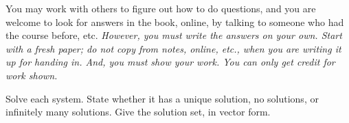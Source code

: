 \documentclass[answers]{exam}
\begin{document}

\vspace*{3ex}
You may work with others to figure out how to do questions, 
and you are welcome to look for answers in the book, online, by talking
to someone who had the course before, etc.
\textit{However, you must write 
  the answers on your own.
  Start with a fresh paper; do not copy from notes, online, etc., when
  you are writing it up for handing in.
  And, you must show your work.
  You can only get credit for work shown.}

\begin{questions}
\question
Solve each system.
State whether it has a unique solution, no solutions, or infinitely many
solutions.
Give the solution set, in vector form.
\end{questions}
\end{document}
